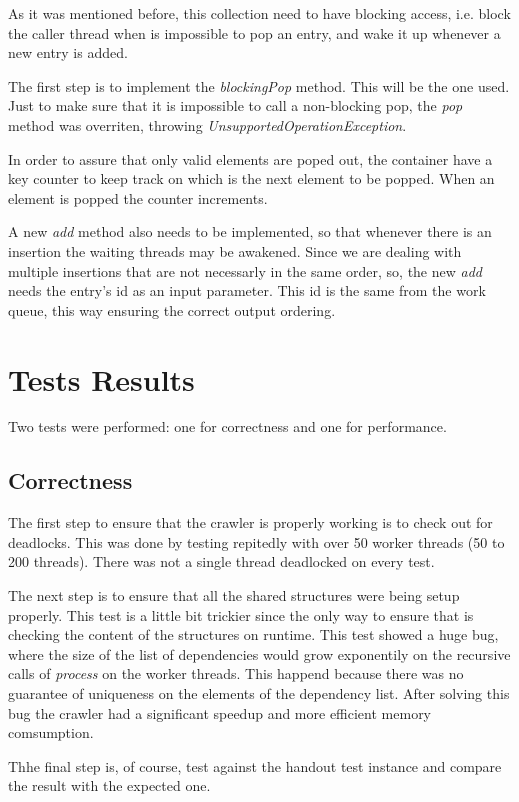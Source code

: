 \documentclass[twocolumn,20pt]{article}
\begin{document}
As it was mentioned before, this collection need to have blocking access, i.e. block the caller thread when is impossible to pop an entry, and wake it up whenever a new entry is added.

The first step is to implement the \textit{blockingPop} method. This will be the one used. Just to make sure that it is impossible to call a non-blocking pop, the \textit{pop} method was overriten, throwing \textit{UnsupportedOperationException}.

In order to assure that only valid elements are poped out, the container have a key counter to keep track on which is the next element to be popped. When an element is popped the counter increments.

A new \textit{add} method also needs to be implemented, so that whenever there is an insertion the waiting threads may be awakened. Since we are dealing with multiple insertions that are not necessarly in the same order, so, the new \textit{add} needs the entry's id as an input parameter. This id is the same from the work queue, this way ensuring the correct output ordering.

\section{Tests Results}
Two tests were performed: one for correctness and one for performance.
\subsection{Correctness}
The first step to ensure that the crawler is properly working is to check out for deadlocks. This was done by testing repitedly with over 50 worker threads (50 to 200 threads). There was not a single thread deadlocked on every test.

The next step is to ensure that all the shared structures were being setup properly. This test is a little bit trickier since the only way to ensure that is checking the content of the structures on runtime. This test showed a huge bug, where the size of the list of dependencies would grow exponentily on the recursive calls of \textit{process} on the worker threads. This happend because there was no guarantee of uniqueness on the elements of the dependency list. After solving this bug the crawler had a significant speedup and more efficient memory comsumption.

Thhe final step is, of course, test against the handout test instance and compare the result with the expected one.
\end{document}
